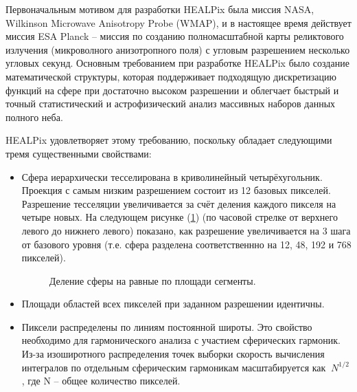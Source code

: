 \documentclass[14pt]{article} %
\begin{document}
Первоначальным мотивом для разработки HEALPix была миссия NASA, Wilkinson Microwave Anisotropy Probe (WMAP), и в настоящее время действует миссия ESA Planck -- миссия по созданию полномасштабной карты реликтового излучения (микроволного анизотропного поля) с угловым разрешением несколько угловых секунд. Основным требованием при разработке HEALPix  было создание математической структуры, которая поддерживает подходящую дискретизацию функций на сфере при достаточно высоком разрешении и облегчает быстрый и точный статистический и астрофизический анализ массивных наборов данных полного неба.

HEALPix удовлетворяет этому требованию, поскольку обладает следующими тремя существенными свойствами:

\begin{itemize}
\item Сфера иерархически тесселирована в криволинейный четырёхугольник. Проекция с самым низким разрешением состоит из 12 базовых пикселей. Разрешение тесселяции увеличивается за счёт деления каждого пикселя на четыре новых. На следующем рисунке (\ref{img:healpix}) (по часовой стрелке от верхнего левого до нижнего левого) показано, как разрешение увеличивается на 3 шага от базового уровня (т.е. сфера разделена соответственнно на 12, 48, 192 и 768 пикселей).

\begin{figure}[h!]
\caption{Деление сферы на равные по площади сегменты.}
\label{img:healpix}
\end{figure}
\item Площади областей всех пикселей при заданном разрешении идентичны.
\item Пиксели распределены по линиям постоянной широты. Это свойство необходимо для гармонического анализа с участием сферических гармоник. Из-за изоширотного распределения точек выборки скорость вычисления интегралов по отдельным сферическим гармоникам масштабируется как $~N^{1/2}$, где N --  общее количество пикселей.
\end{itemize}
\end{document}
